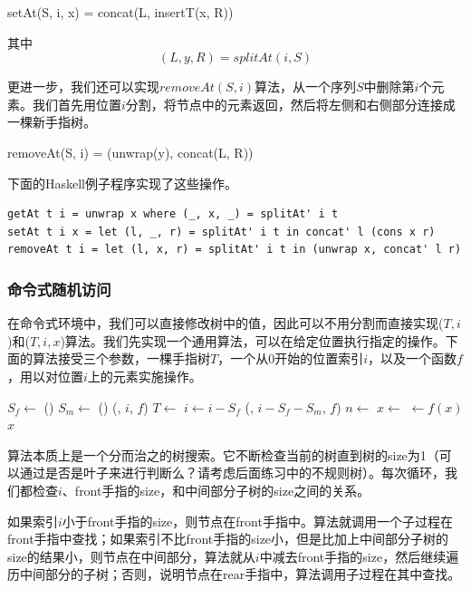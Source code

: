 \documentclass[b5paper]{ctexart}
\begin{document}
\be
setAt(S, i, x) = concat(L, insertT(x, R))
\ee

其中
\[
(L, y, R) = splitAt(i, S)
\]

更进一步，我们还可以实现$removeAt(S, i)$算法，从一个序列$S$中删除第$i$个元素。我们首先用位置$i$分割，将节点中的元素返回，然后将左侧和右侧部分连接成一棵新手指树。

\be
removeAt(S, i) = (unwrap(y), concat(L, R))
\ee

下面的Haskell例子程序实现了这些操作。

\lstset{language=Haskell}
\begin{lstlisting}[style=Haskell]
getAt t i = unwrap x where (_, x, _) = splitAt' i t
setAt t i x = let (l, _, r) = splitAt' i t in concat' l (cons x r)
removeAt t i = let (l, x, r) = splitAt' i t in (unwrap x, concat' l r)
\end{lstlisting}

\subsubsection{命令式随机访问}

在命令式环境中，我们可以直接修改树中的值，因此可以不用分割而直接实现($T, i$)和($T, i, x$)算法。我们先实现一个通用算法，可以在给定位置执行指定的操作。下面的算法接受三个参数，一棵手指树$T$，一个从0开始的位置索引$i$，以及一个函数$f$，用以对位置$i$上的元素实施操作。

\begin{algorithmic}
    \State $S_f \gets $ ()
    \State $S_m \gets $ ()
      \State \Return {}(, $i$, $f$)
      \State $T \gets$ 
      \State $i \gets i - S_f$
    \Else
      \State \Return {}(, $i - S_f - S_m$, $f$)
    \EndIf
  \EndWhile
  \State $n \gets$ 
  \State $x \gets$ 
  \State {} $\gets f(x)$
  \State \Return $x$
\EndFunction
\end{algorithmic}

算法本质上是一个分而治之的树搜索。它不断检查当前的树直到树的size为1（可以通过是否是叶子来进行判断么？请考虑后面练习中的不规则树）。每次循环，我们都检查$i$、front手指的size，和中间部分子树的size之间的关系。

如果索引$i$小于front手指的size，则节点在front手指中。算法就调用一个子过程在front手指中查找；如果索引不比front手指的size小，但是比加上中间部分子树的size的结果小，则节点在中间部分，算法就从$i$中减去front手指的size，然后继续遍历中间部分的子树；否则，说明节点在rear手指中，算法调用子过程在其中查找。
\end{document}
